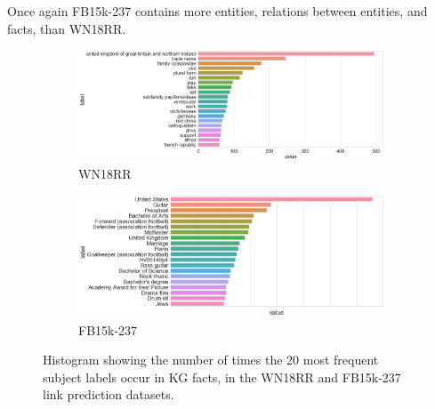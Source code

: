 \noindent Once again FB15k-237 contains more entities, relations between entities, and facts, than WN18RR.


\begin{figure}
	\begin{subfigure}[b]{.5\linewidth}
   		\centering
    		\includegraphics[width=1.0\linewidth, height=0.7\linewidth]{WN18RR_Subject_Counts}
		\captionsetup{justification=centering}
		\caption{WN18RR}
	\end{subfigure}
	\begin{subfigure}[b]{.5\linewidth}
   		\centering
		\includegraphics[width=1.0\linewidth, height=0.7\linewidth]{FB15k-237_Subject_Counts}
		\captionsetup{justification=centering}
		\caption{FB15k-237}
	\end{subfigure}
	\captionsetup{justification=centering}
	\caption{Histogram showing the number of times the 20 most frequent subject labels occur in KG facts, in the WN18RR and FB15k-237 link prediction datasets.}
\end{figure}

